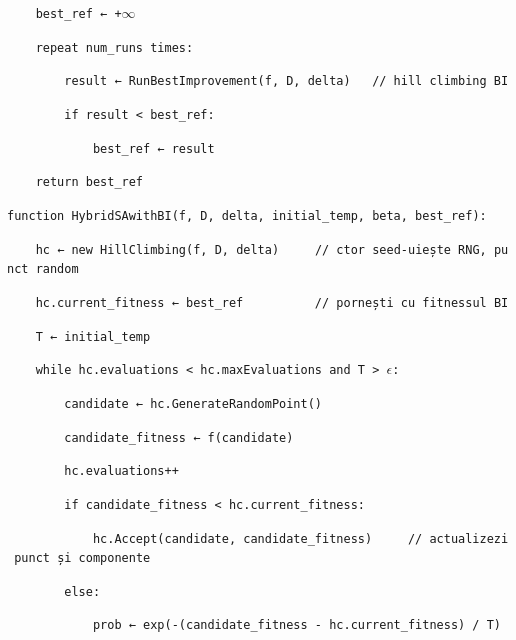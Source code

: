 \documentclass[
]{article}
\begin{document}
\texttt{\ \ \ \ }\texttt{best\_ref}\texttt{\ ←\ +$\infty$}

\texttt{\ \ \ \ repeat\ }\texttt{num\_runs}\texttt{\ times:}

\texttt{\ \ \ \ \ \ \ \ result\ ←\ }\texttt{RunBestImprovement}\texttt{(}\texttt{f,\ D,\ }\texttt{delta)\ \ \ }\texttt{//\ hill\ climbing\ BI}

\texttt{\ \ \ \ \ \ \ \ if\ result\ \textless{}\ }\texttt{best\_ref}\texttt{:}

\texttt{\ \ \ \ \ \ \ \ \ \ \ \ }\texttt{best\_ref}\texttt{\ ←\ result}

\texttt{\ \ \ \ return\ }\texttt{best\_ref}

\texttt{function\ }\texttt{HybridSAwithBI}\texttt{(}\texttt{f,\ D,\ delta,\ }\texttt{initial\_temp}\texttt{,\ beta,\ }\texttt{best\_ref}\texttt{):}

\texttt{\ \ \ \ }\texttt{hc}\texttt{\ ←\ new\ }\texttt{HillClimbing}\texttt{(}\texttt{f,\ D,\ }\texttt{delta)\ \ \ }\texttt{\ \ //\ }\texttt{ctor}\texttt{\ seed}\texttt{‑}\texttt{uie}\texttt{ș}\texttt{te}\texttt{\ RNG,\ }\texttt{punct}\texttt{\ random}

\texttt{\ \ \ \ }\texttt{hc.current}\texttt{\_fitness}\texttt{\ ←\ }\texttt{best\_ref}\texttt{\ \ \ \ \ \ \ \ \ \ //\ }\texttt{pornești}\texttt{\ cu\ }\texttt{fitnessul}\texttt{\ BI}

\texttt{\ \ \ \ T\ ←\ }\texttt{initial\_temp}

\texttt{\ \ \ \ while\ }\texttt{hc.evaluations}\texttt{\ \textless{}\ }\texttt{hc.maxEvaluations}\texttt{\ and\ T\ \textgreater{}\ $\epsilon$:}

\texttt{\ \ \ \ \ \ \ \ candidate\ ←\ }\texttt{hc.GenerateRandomPoint}\texttt{()}

\texttt{\ \ \ \ \ \ \ \ }\texttt{candidate\_}\texttt{fitness}\texttt{\ ←\ f}\texttt{(candidate)}

\texttt{\ \ \ \ \ \ \ \ }\texttt{hc.evaluations}\texttt{++}

\texttt{\ \ \ \ \ \ \ \ if\ }\texttt{candidate\_fitness}\texttt{\ \textless{}\ }\texttt{hc.current}\texttt{\_fitness}\texttt{:}

\texttt{\ \ \ \ \ \ \ \ \ \ \ \ }\texttt{hc.Accept}\texttt{(candidate,\ }\texttt{candidate\_}\texttt{fitness}\texttt{)\ \ \ }\texttt{\ \ //\ }\texttt{actualizezi}\texttt{\ }\texttt{punct}\texttt{\ și\ }\texttt{componente}

\texttt{\ \ \ \ \ \ \ \ else:}

\texttt{\ \ \ \ \ \ \ \ \ \ \ \ prob\ ←\ }\texttt{exp(-(}\texttt{candidate\_fitness}\texttt{\ -\ }\texttt{hc.current}\texttt{\_fitness}\texttt{)\ /\ T)}
\end{document}
